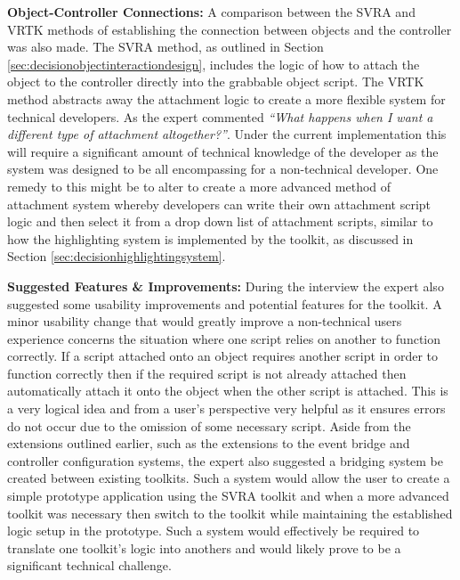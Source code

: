 \documentclass{l4proj}
\begin{document}
\textbf{Object-Controller Connections:} A comparison between the SVRA and VRTK methods of establishing the connection between objects and the controller was also made. The SVRA method, as outlined in Section \ref{sec:decisionobjectinteractiondesign}, includes the logic of how to attach the object to the controller directly into the grabbable object script. The VRTK method abstracts away the attachment logic to create a more flexible system for technical developers. As the expert commented \textit{``What happens when I want a different type of attachment altogether?''}. Under the current implementation this will require a significant amount of technical knowledge of the developer as the system was designed to be all encompassing for a non-technical developer. One remedy to this might be to alter to create a more advanced method of attachment system whereby developers can write their own attachment script logic and then select it from a drop down list of attachment scripts, similar to how the highlighting system is implemented by the toolkit, as discussed in Section \ref{sec:decisionhighlightingsystem}. 

\textbf{Suggested Features \& Improvements:} During the interview the expert also suggested some usability improvements and potential features for the toolkit. A minor usability change that would greatly improve a non-technical users experience concerns the situation where one script relies on another to function correctly. If a script attached onto an object requires another script in order to function correctly then if the required script is not already attached then automatically attach it onto the object when the other script is attached. This is a very logical idea and from a user's perspective very helpful as it ensures errors do not occur due to the omission of some necessary script. Aside from the extensions outlined earlier, such as the extensions to the event bridge and controller configuration systems, the expert also suggested a bridging system be created between existing toolkits. Such a system would allow the user to create a simple prototype application using the SVRA toolkit and when a more advanced toolkit was necessary then switch to the toolkit while maintaining the established logic setup in the prototype. Such a system would effectively be required to translate one toolkit's logic into anothers and would likely prove to be a significant technical challenge. 
\end{document}
